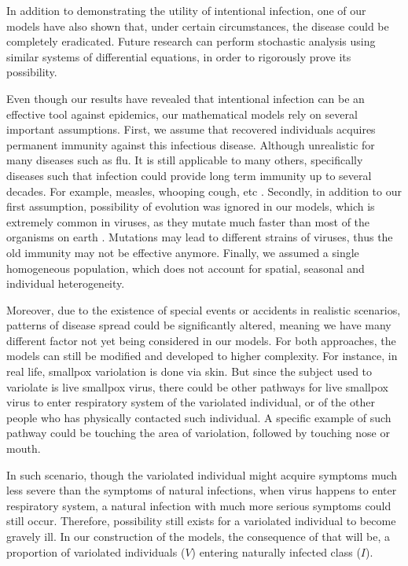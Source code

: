 \documentclass[12pt]{article}
\begin{document}
In addition to demonstrating the utility of intentional infection, one of our models have also shown that, under certain circumstances, the disease could be completely eradicated. Future research can perform stochastic analysis using similar systems of differential equations, in order to rigorously prove its possibility.

Even though our results have revealed that intentional infection can be an effective tool against epidemics, our mathematical models rely on several important assumptions. First, we assume that recovered individuals acquires permanent immunity against this infectious disease. Although unrealistic for many diseases such as flu. It is still applicable to many others, specifically diseases such that infection could provide long term immunity up to several decades. For example, measles, whooping cough, etc \cite{amanna2007duration}. Secondly, in addition to our first assumption, possibility of evolution was ignored in our models, which is extremely common in viruses, as they mutate much faster than most of the organisms on earth \cite{purcell2000hepatitis}. Mutations may lead to different strains of viruses, thus the old immunity may not be effective anymore. Finally, we assumed a single homogeneous population, which does not account for spatial, seasonal and individual heterogeneity.

Moreover, due to the existence of special events or accidents in realistic scenarios, patterns of disease spread could be significantly altered, meaning we have many different factor not yet being considered in our models. For both approaches, the models can still be modified and developed to higher complexity. For instance, in real life, smallpox variolation is done via skin. But since the subject used to variolate is live smallpox virus, there could be other pathways for live smallpox virus to enter respiratory system of the variolated individual, or of the other people who has physically contacted such individual. A specific example of such pathway could be touching the area of variolation, followed by touching nose or mouth. 

In such scenario, though the variolated individual might acquire symptoms much less severe than the symptoms of natural infections, when virus happens to enter respiratory system, a natural infection with much more serious symptoms could still occur. Therefore, possibility still exists for a variolated individual to become gravely ill. In our construction of the models, the consequence of that will be, a proportion of variolated individuals ($V$) entering naturally infected class ($I$).
\end{document}
